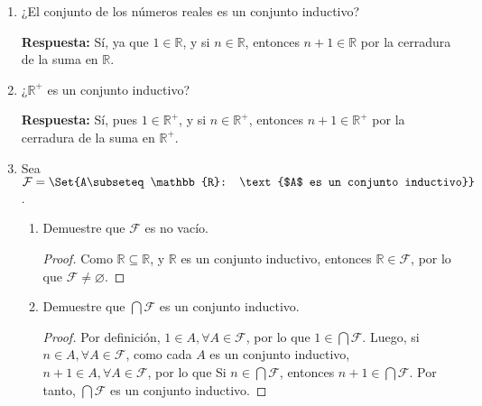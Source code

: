 \documentclass[11pt]{article}
\newcommand{\N}{\mathbb{N}}
\newcommand{\R}{\mathbb{R}}
\newcommand{\bfit}[1]{\textbf{\textit{#1}}}
\let\emptyset\varnothing
\let\set\Set
\let\subset\subseteq
\begin{document}
\begin{enumerate}[label=\arabic*)]
    \item ¿El conjunto de los números reales es un conjunto inductivo?
    
    \textbf{Respuesta:} Sí, ya que $1 \in \R$, y si $n\in \R$, entonces $n+1 \in \R$ por la cerradura de la suma en $\R$.


    \item ¿$\R^+$ es un conjunto inductivo?
    
    \textbf{Respuesta:} Sí, pues $1\in \R^+$, y si $n\in \R^+$, entonces $n+1 \in \R^+$ por la cerradura de la suma en $\R^+$.

    \item Sea $\mathcal{F}= \set{A\subset \R: \text{$A$ es un conjunto inductivo}}$.
    \begin{enumerate}[label=\alph*)]
    \item Demuestre que $\mathcal{F}$ es no vacío.
    \begin{proof}
        Como $\R \subset \R$, y $\R$ es un conjunto inductivo, entonces $\R \in \mathcal{F}$, por lo que $\mathcal{F} \neq \emptyset$.
    \end{proof}%
    \item Demuestre que $\bigcap \mathcal{F}$ es un conjunto inductivo.%
    \begin{proof}
    Por definición, $1\in A, \forall A\in \mathcal{F}$, por lo que $1\in \bigcap \mathcal{F}$. Luego, si $n\in A, \forall A\in \mathcal{F}$, como cada $A$ es un conjunto inductivo, $n+1\in A, \forall A\in \mathcal{F}$, por lo que Si $n \in \bigcap \mathcal{F}$, entonces $n+1 \in \bigcap \mathcal{F}$. Por tanto, $\bigcap \mathcal{F}$ es un conjunto inductivo.
    \end{proof}%
    \end{enumerate}

\end{enumerate}
%
\end{document}
